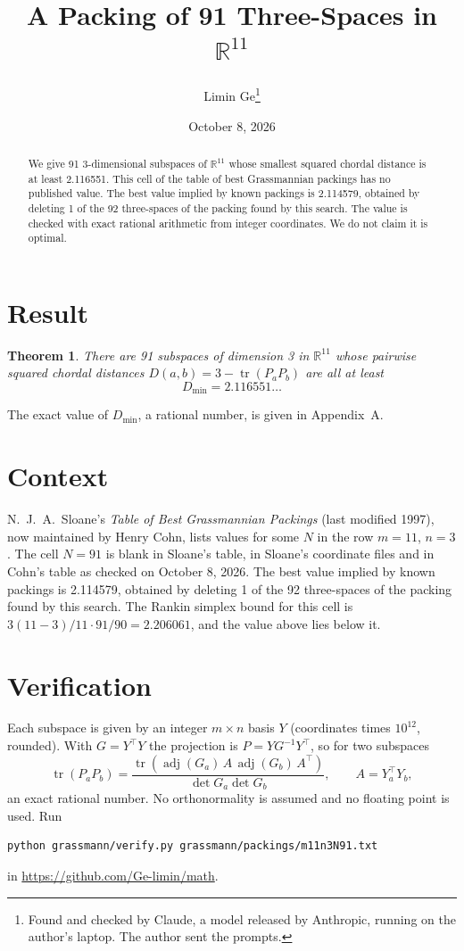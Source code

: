 \documentclass[11pt,a4paper]{article}
\title{A Packing of 91 Three-Spaces in $\mathbb{R}^{11}$}
\author{Limin Ge\thanks{Found and checked by Claude, a model released by Anthropic, running on the author's laptop. The author sent the prompts.}}
\date{October 8, 2026}
\newtheorem*{theorem}{Theorem}
\begin{document}
\maketitle
\begin{abstract}
We give 91 3-dimensional subspaces of $\mathbb{R}^{11}$ whose smallest squared chordal distance is at least 2.116551. This cell of the table of best Grassmannian packings has no published value. The best value implied by known packings is 2.114579, obtained by deleting 1 of the 92 three-spaces of the packing found by this search. The value is checked with exact rational arithmetic from integer coordinates. We do not claim it is optimal.
\end{abstract}

\section{Result}
\begin{theorem}
There are 91 subspaces of dimension 3 in $\mathbb{R}^{11}$ whose pairwise squared chordal distances $D(a,b) = 3 - \operatorname{tr}(P_aP_b)$ are all at least
\[ D_{\min} = 2.116551\ldots \]
\end{theorem}
The exact value of $D_{\min}$, a rational number, is given in Appendix~A.


\section{Context}
N.~J.~A.~Sloane's \emph{Table of Best Grassmannian Packings} (last modified 1997), now maintained by Henry Cohn, lists values for some $N$ in the row $m=11$, $n=3$. The cell $N=91$ is blank in Sloane's table, in Sloane's coordinate files and in Cohn's table as checked on October 8, 2026. The best value implied by known packings is 2.114579, obtained by deleting 1 of the 92 three-spaces of the packing found by this search. The Rankin simplex bound for this cell is $3(11-3)/11\cdot 91/90 = 2.206061$, and the value above lies below it.


\section{Verification}
Each subspace is given by an integer $m\times n$ basis $Y$ (coordinates times $10^{12}$, rounded). With $G=Y^\top Y$ the projection is $P=YG^{-1}Y^\top$, so for two subspaces
\[ \operatorname{tr}(P_aP_b)=\frac{\operatorname{tr}(\operatorname{adj}(G_a)\,A\,\operatorname{adj}(G_b)\,A^\top)}{\det G_a\det G_b},\qquad A=Y_a^\top Y_b, \]
an exact rational number. No orthonormality is assumed and no floating point is used. Run
\begin{verbatim}
python grassmann/verify.py grassmann/packings/m11n3N91.txt
\end{verbatim}
in \url{https://github.com/Ge-limin/math}.
\end{document}
